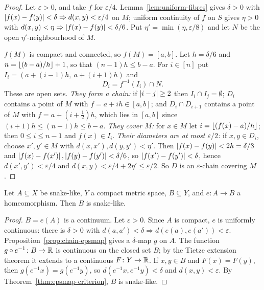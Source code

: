 \begin{proof}
Let $\varepsilon>0$, and take $f$ for $\varepsilon/4$. Lemma~\ref{lem:uniform-fibres} gives $\delta>0$
with $\left\lvert f(x)-f(y)\right\rvert<\delta\Rightarrow d(x,y)<\varepsilon/4$ on $M$; uniform continuity of $f$ on $S$
gives $\eta>0$ with $d(x,y)<\eta\Rightarrow\left\lvert f(x)-f(y)\right\rvert<\delta/6$. Put $\eta'=\min(\eta,\varepsilon/8)$
and let $N$ be the open $\eta'$-neighbourhood of $M$.

$f(M)$ is compact and connected, so $f(M)=[a,b]$. Let $h=\delta/6$ and $n=\left\lfloor (b-a)/h\right\rfloor+1$, so that
$(n-1)h\le b-a$. For $i\in[n]$ put $I_i=(a+(i-1)h,\ a+(i+1)h)$ and
\[
D_i=f^{-1}(I_i)\cap N .
\]
These are open sets. \emph{They form a chain:} if $\left\lvert i-j\right\rvert\ge2$ then $I_i\cap I_j=\emptyset$; $D_i$
contains a point of $M$ with $f=a+ih\in[a,b]$; and $D_i\cap D_{i+1}$ contains a point of $M$ with
$f=a+(i+\frac12)h$, which lies in $[a,b]$ since $(i+1)h\le(n-1)h\le b-a$. \emph{They cover $M$:} for
$x\in M$ let $i=\left\lfloor (f(x)-a)/h\right\rfloor$; then $0\le i\le n-1$ and $f(x)\in I_i$. \emph{Their diameters are at
most $\varepsilon/2$:} if $x,y\in D_i$, choose $x',y'\in M$ with $d(x,x'),d(y,y')<\eta'$. Then
$\left\lvert f(x)-f(y)\right\rvert<2h=\delta/3$ and $\left\lvert f(x)-f(x')\right\rvert,\left\lvert f(y)-f(y')\right\rvert<\delta/6$, so
$\left\lvert f(x')-f(y')\right\rvert<\delta$, hence $d(x',y')<\varepsilon/4$ and $d(x,y)<\varepsilon/4+2\eta'\le\varepsilon/2$.
So $D$ is an $\varepsilon$-chain covering $M$.
\end{proof}


\begin{theorem}\label{thm:snake-homeo}
Let $A\subseteq X$ be snake-like, $Y$ a compact metric space, $B\subseteq Y$, and $e\colon A\to B$ a
homeomorphism. Then $B$ is snake-like.
\end{theorem}

\begin{proof}
$B=e(A)$ is a continuum. Let $\varepsilon>0$. Since $A$ is compact, $e$ is uniformly continuous: there is
$\delta>0$ with $d(a,a')<\delta\Rightarrow d(e(a),e(a'))<\varepsilon$. Proposition~\ref{prop:chain-epsmap}
gives a $\delta$-map $g$ on $A$. The function $g\circ e^{-1}\colon B\to\mathbb{R}$ is continuous on the closed
set $B$; by the Tietze extension theorem it extends to a continuous $F\colon Y\to\mathbb{R}$. If $x,y\in B$ and
$F(x)=F(y)$, then $g(e^{-1}x)=g(e^{-1}y)$, so $d(e^{-1}x,e^{-1}y)<\delta$ and $d(x,y)<\varepsilon$. By
Theorem~\ref{thm:epsmap-criterion}, $B$ is snake-like.
\end{proof}

